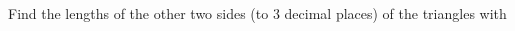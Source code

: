 \question Find the lengths of the other two sides (to 3 decimal places) of the 
triangles with
\begin{multicols}{3}
\end{multicols}
